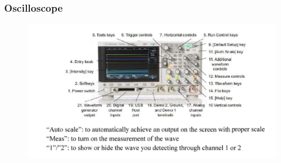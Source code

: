 \documentclass{article}
\begin{document}
\subsubsection{Oscilloscope}
\begin{figure}[H]
	\centering
	\includegraphics[width=0.7\linewidth]{pic6}
	\label{fig:pic6}
\end{figure}
\end{document}
